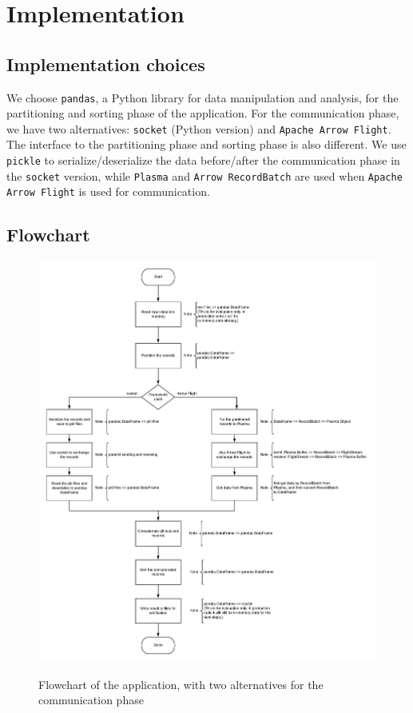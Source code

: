 \documentclass{article}
\begin{document}
\section{Implementation}

\subsection{Implementation choices}
We choose \texttt{pandas}, a Python library for data manipulation and analysis, 
for the partitioning and sorting phase of the application.
For the communication phase, we have two alternatives: \texttt{socket} (Python version) and \texttt{Apache Arrow Flight}.
The interface to the partitioning phase and sorting phase is also different.
We use \texttt{pickle} to serialize/deserialize the data before/after the communication phase in the \texttt{socket} version,
while \texttt{Plasma} and \texttt{Arrow RecordBatch} are used when \texttt{Apache Arrow Flight} is used for communication.

\subsection{Flowchart}

\begin{figure}[h!]
    \caption{Flowchart of the application, with two alternatives for the communication phase}
    \centering
      \includegraphics[width=1.0\textwidth]{flowchart}
    \label{fig:flowchart}
\end{figure}
\end{document}
